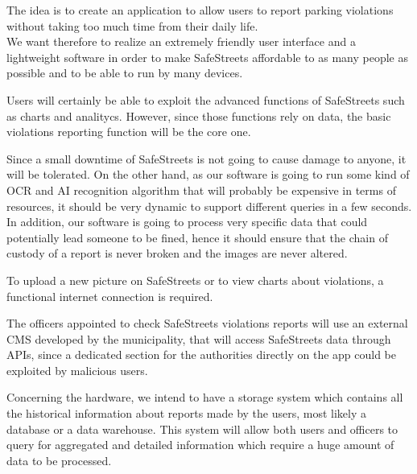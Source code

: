 \setlength{\parskip}{1em}
The idea is to create an application to allow users to report parking violations without taking too much time from their daily life.
\\We want therefore to realize an extremely friendly user interface and a lightweight software in order to make SafeStreets affordable to as many people as possible and to be able to run by many devices.

Users will certainly be able to exploit the advanced functions of SafeStreets such as charts and analitycs. However, since those functions rely on data, the basic violations reporting function will be the core one.

Since a small downtime of SafeStreets is not going to cause damage to anyone, it will be tolerated. On the other hand, as our software is going to run some kind of OCR and AI recognition algorithm that will probably be expensive in terms of resources, it should be very dynamic to support different queries in a few seconds.
\\In addition, our software is going to process very specific data that could potentially lead someone to be fined, hence it should ensure that the chain of custody of a report is never broken and the images are never altered.

To upload a new picture on SafeStreets or to view charts about violations, a functional internet connection is required.

The officers appointed to check SafeStreets violations reports will use an external CMS developed by the municipality, that will access SafeStreets data through APIs, since a dedicated section for the authorities directly on the app could be exploited by malicious users.

Concerning the hardware, we intend to have a storage system which contains all the historical information about reports made by the users, most likely a database or a data warehouse. This system will allow both users and officers to query for aggregated and detailed information which require a huge amount of data to be processed.
\clearpage